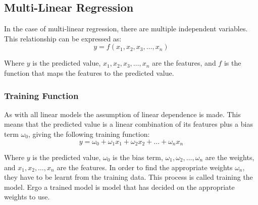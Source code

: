 \documentclass[12pt letter]{report}
\begin{document}
\subsection{Multi-Linear Regression}
In the case of multi-linear regression, there are multiple independent variables. This relationship can be expressed as:
\[
  y = f \left( x_1, x_2, x_3, \ldots, x_n \right)
\]

Where $y$ is the predicted value, $x_1, x_2, x_3, \ldots, x_n$ are the features, and $f$ is the function that maps the features to the predicted value.

\subsubsection{Training Function}

As with all linear models the assumption of linear dependence is made. This means that the predicted value is a linear
combination of its features plus a bias term $\omega_0$, giving the following training function:
\[
  y = \omega_0 + \omega_1 x_1 + \omega_2 x_2 + \ldots + \omega_n x_n
\]

Where $y$ is the predicted value, $\omega_0$ is the bias term, $\omega_1, \omega_2, \ldots, \omega_n$ are the weights,
and $x_1, x_2, \ldots, x_n$ are the features. In order to find the appropriate weights $\omega_n$, they have to be
learnt from the training data.  This process is called training the model. Ergo a trained model is model that has
decided on the appropriate weights to use.
\end{document}
